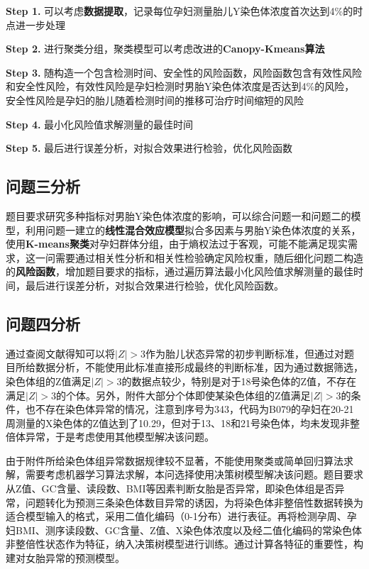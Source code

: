 \documentclass[withoutpreface,bwprint]{cumcmthesis}
\begin{document}
\textbf{Step 1.} 可以考虑\textbf{数据提取}，记录每位孕妇测量胎儿Y染色体浓度首次达到4\%的时点进一步处理

\textbf{Step 2.} 进行聚类分组，聚类模型可以考虑改进的\textbf{Canopy-Kmeans算法}

\textbf{Step 3.} 随构造一个包含检测时间、安全性的风险函数，风险函数包含有效性风险和安全性风险，有效性风险是孕妇检测时男胎Y染色体浓度是否达到4\%的风险，安全性风险是孕妇的胎儿随着检测时间的推移可治疗时间缩短的风险

\textbf{Step 4.} 最小化风险值求解测量的最佳时间

\textbf{Step 5.} 最后进行误差分析，对拟合效果进行检验，优化风险函数

\subsection{问题三分析}
题目要求研究多种指标对男胎Y染色体浓度的影响，可以综合问题一和问题二的模型，利用问题一建立的\textbf{线性混合效应模型}拟合多因素与男胎Y染色体浓度的关系，使用\textbf{K-means聚类}对孕妇群体分组，由于熵权法过于客观，可能不能满足现实需求，这一问需要通过相关性分析和相关性检验确定风险权重，随后细化问题二构造的\textbf{风险函数}，增加题目要求的指标，通过遍历算法最小化风险值求解测量的最佳时间，最后进行误差分析，对拟合效果进行检验，优化风险函数。

\subsection{问题四分析}
通过查阅文献得知可以将$|Z|>3$作为胎儿状态异常的初步判断标准，但通过对题目所给数据分析，不能使用此标准直接形成最终的判断标准，因为通过数据筛选，染色体组的Z值满足$|Z|>3$的数据点较少，特别是对于18号染色体的Z值，不存在满足$|Z|>3$的个体。另外，附件大部分个体即使某染色体组的Z值满足$|Z|>3$的条件，也不存在染色体异常的情况，注意到序号为343，代码为B079的孕妇在20-21周测量的X染色体的Z值达到了10.29，但对于13、18和21号染色体，均未发现非整倍体异常，于是考虑使用其他模型解决该问题。

由于附件所给染色体组异常数据规律较不显著，不能使用聚类或简单回归算法求解，需要考虑机器学习算法求解，本问选择使用决策树模型解决该问题。题目要求从Z值、GC含量、读段数、BMI等因素判断女胎是否异常，即染色体组是否异常，问题转化为预测三条染色体数目异常的诱因，为将染色体非整倍性数据转换为适合模型输入的格式，采用二值化编码（0-1分布）进行表征。再将检测孕周、孕妇BMI、测序读段数、GC含量、Z值、X染色体浓度以及经二值化编码的常染色体非整倍性状态作为特征，纳入决策树模型进行训练。通过计算各特征的重要性，构建对女胎异常的预测模型。
\end{document}
